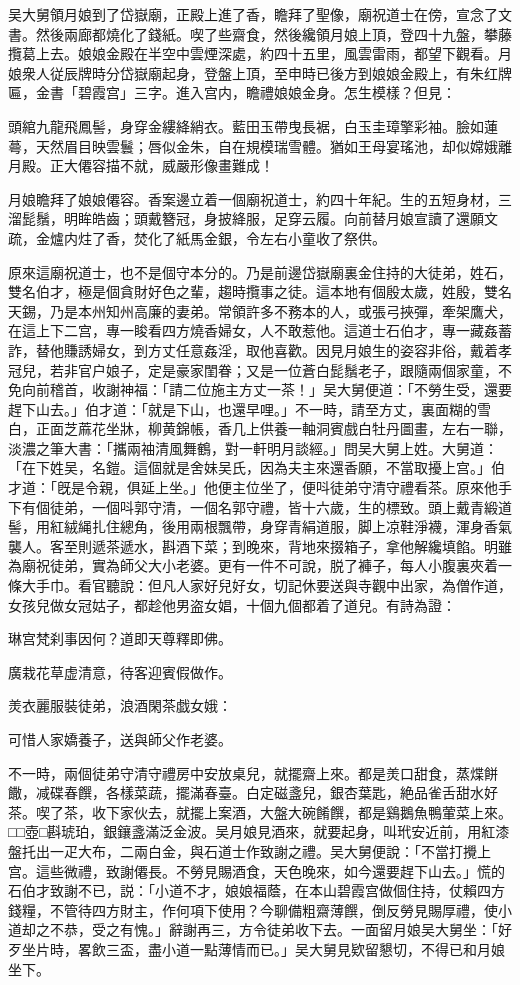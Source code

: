 吴大舅領月娘到了岱嶽廟，正殿上進了香，瞻拜了聖像，廟祝道士在傍，宣念了文書。然後兩廊都燒化了錢紙。喫了些齋食，然後纔領月娘上頂，登四十九盤，攀藤攬葛上去。娘娘金殿在半空中雲煙深處，約四十五里，風雲雷雨，都望下觀看。月娘衆人従辰牌時分岱嶽廟起身，登盤上頂，至申時已後方到娘娘金殿上，有朱红牌匾，金書「碧霞宫」三字。進入宫内，瞻禮娘娘金身。怎生模樣？但見：

頭綰九龍飛鳳髻，身穿金縷絳綃衣。藍田玉帶曳長裾，白玉圭璋擎彩袖。臉如蓮蕚，天然眉目映雲鬟；唇似金朱，自在規模瑞雪體。猶如王母宴瑤池，却似嫦娥離月殿。正大僊容描不就，威嚴形像畫難成！

月娘瞻拜了娘娘僊容。香案邊立着一個廟祝道士，約四十年紀。生的五短身材，三溜髭鬚，明眸皓齒；頭戴簪冠，身披絳服，足穿云履。向前替月娘宣讀了還願文疏，金爐内炷了香，焚化了紙馬金銀，令左右小童收了祭供。

原來這廟祝道士，也不是個守本分的。乃是前邊岱嶽廟裏金住持的大徒弟，姓石，雙名伯才，極是個貪財好色之輩，趨時攬事之徒。這本地有個殷太歲，姓殷，雙名天錫，乃是本州知州高廉的妻弟。常領許多不務本的人，或張弓挾彈，牽架鷹犬，在這上下二宫，專一睃看四方燒香婦女，人不敢惹他。這道士石伯才，專一藏姦蓄詐，替他賺誘婦女，到方丈任意姦淫，取他喜歡。因見月娘生的姿容非俗，戴着孝冠兒，若非官户娘子，定是豪家閨眷；又是一位蒼白髭鬚老子，跟隨兩個家童，不免向前稽首，收謝神福：「請二位施主方丈一茶！」吴大舅便道：「不勞生受，還要趕下山去。」伯才道：「就是下山，也還早哩。」不一時，請至方丈，裏面糊的雪白，正面芝蔴花坐牀，柳黄錦帳，香几上供養一軸洞賓戲白牡丹圖畫，左右一聯，淡濃之筆大書：「攜兩袖清風舞鶴，對一軒明月談經。」問吴大舅上姓。大舅道：「在下姓吴，名鎧。這個就是舍妹吴氏，因為夫主來還香願，不當取擾上宫。」伯才道：「旣是令親，俱延上坐。」他便主位坐了，便呌徒弟守清守禮看茶。原來他手下有個徒弟，一個呌郭守清，一個名郭守禮，皆十六歲，生的標致。頭上戴青緞道髻，用紅絨䋲扎住總角，後用兩根飄帶，身穿青絹道服，脚上凉鞋淨襪，渾身香氣襲人。客至則遞茶遞水，斟酒下菜；到晚來，背地來掇箱子，拿他解纔填餡。明雖為廟祝徒弟，實為師父大小老婆。更有一件不可說，脱了褲子，每人小腹裏夾着一條大手巾。看官聽說：但凡人家好兒好女，切記休要送與寺觀中出家，為僧作道，女孩兒做女冠姑子，都趁他男盗女娼，十個九個都着了道兒。有詩為證：

琳宫梵刹事因何？道即天尊釋即佛。

廣栽花草虚清意，待客迎賓假做作。

羙衣麗服裝徒弟，浪酒閑茶戯女娥：

可惜人家嬌養子，送與師父作老婆。

不一時，兩個徒弟守清守禮房中安放桌兒，就擺齋上來。都是羙口甜食，蒸煠餅饊，减碟春饌，各樣菜蔬，擺滿春臺。白定磁盞兒，銀杏葉匙，絶品雀舌甜水好茶。喫了茶，收下家伙去，就擺上案酒，大盤大碗餚饌，都是鷄鵝魚鴨葷菜上來。□□壺□斟琥珀，銀鑲盞滿泛金波。吴月娘見酒來，就要起身，叫玳安近前，用紅漆盤托出一疋大布，二兩白金，與石道士作致謝之禮。吴大舅便說：「不當打攪上宫。這些微禮，致謝僊長。不勞見賜酒食，天色晚來，如今還要趕下山去。」慌的石伯才致謝不已，説：「小道不才，娘娘福蔭，在本山碧霞宫做個住持，仗賴四方錢糧，不管待四方財主，作何項下使用？今聊備粗齋薄饌，倒反勞見賜厚禮，使小道却之不恭，受之有愧。」辭謝再三，方令徒弟收下去。一面留月娘吴大舅坐：「好歹坐片時，畧飲三盃，盡小道一點薄情而已。」吴大舅見欵留懇切，不得已和月娘坐下。

